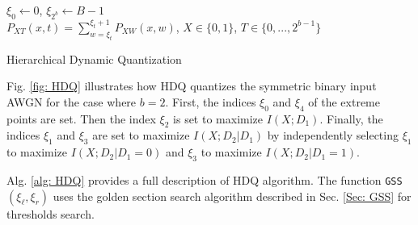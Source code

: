 \documentclass [PhD] {uclathes}
\begin{document}
\begin{algorithm}[t]
    \label{alg: HDQ}
    
    $\xi_0\leftarrow 0$, 
    $\xi_{2^b}\leftarrow B-1$\\
    $P_{XT}(x,t)=\sum_{w=\xi_t}^{\xi_t+1}P_{XW}(x,w)$, $X\in\{0,1\}$, $T\in\{0,...,2^{b-1}\}$
    \caption{Hierarchical Dynamic Quantization }
    \end{algorithm}
Fig. \ref{fig: HDQ} illustrates how HDQ quantizes the symmetric binary input AWGN for the case where $b=2$. First, the indices  $\xi_0$  and $\xi_4$ of the extreme points are set.  Then the index $\xi_2$ is set to maximize $I(X;D_1)$.  Finally, the indices $\xi_1$ and $\xi_3$ are set to maximize $I(X;D_2| D_1)$ by independently selecting $\xi_1$ to maximize $I(X;D_2| D_1=0)$ and $\xi_3$ to maximize $I(X;D_2| D_1=1)$.


Alg. \ref{alg: HDQ} provides a full description of HDQ algorithm. The function \texttt{GSS}$(\xi_{\ell},\xi_r)$ uses the golden section search algorithm described in Sec. \ref{Sec: GSS} for thresholds search.


%
\end{document}
